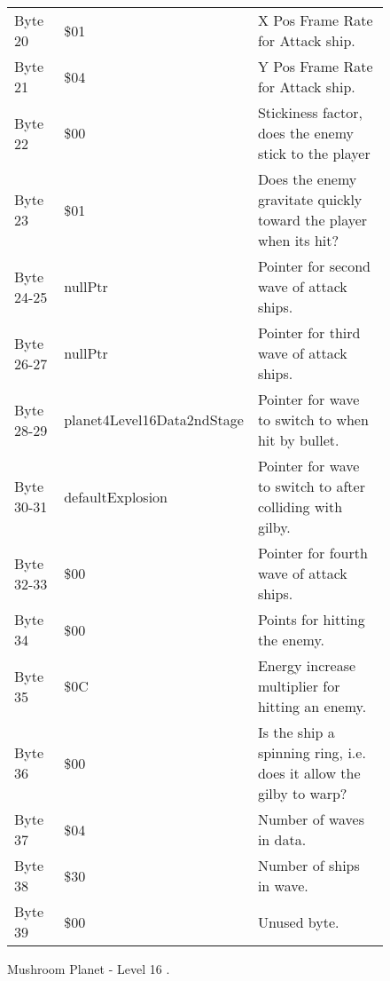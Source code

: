 \begin{figure}[H]
{\begin{adjustbox}{width=12cm}
\begin{tabular}{lll}
 Byte 20    & \$01                        & X Pos Frame Rate for Attack ship.                                   \\
 Byte 21    & \$04                        & Y Pos Frame Rate for Attack ship.                                   \\
 Byte 22    & \$00                        & Stickiness factor, does the enemy stick to the player               \\
 Byte 23    & \$01                        & Does the enemy gravitate quickly toward the player when its hit?    \\
 Byte 24-25 & nullPtr                    & Pointer for second wave of attack ships.                            \\
 Byte 26-27 & nullPtr                    & Pointer for third wave of attack ships.                             \\
 Byte 28-29 & planet4Level16Data2ndStage & Pointer for wave to switch to when hit by bullet.                   \\
 Byte 30-31 & defaultExplosion           & Pointer for  wave to switch to after colliding with gilby.          \\
 Byte 32-33 & \$00                        & Pointer for fourth wave of attack ships.                            \\
 Byte 34    & \$00                        & Points for hitting the enemy.                                       \\
 Byte 35    & \$0C                        & Energy increase multiplier for hitting an enemy.                    \\
 Byte 36    & \$00                        & Is the ship a spinning ring, i.e. does it allow the gilby to warp?  \\
 Byte 37    & \$04                        & Number of waves in data.                                            \\
 Byte 38    & \$30                        & Number of ships in wave.                                            \\
 Byte 39    & \$00                        & Unused byte.                                                        \\
\bottomrule
\end{tabular}

  \end{adjustbox}

  }\caption*{Mushroom Planet - Level 16
.}
\end{figure}

